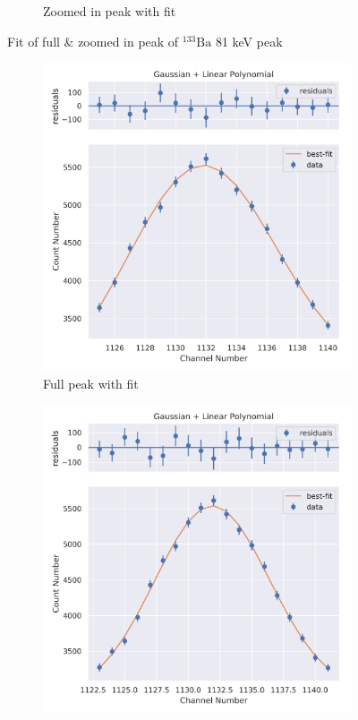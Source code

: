 \documentclass[11pt,a4paper]{article}
\newcommand{\element}[2]{$^{#2}\textrm{#1}$}
\begin{document}
\begin{figure}[H]
\begin{subfigure}{.5\linewidth}
    \caption{Zoomed in peak with fit}
  \end{subfigure}
  \caption{Fit of full \& zoomed in peak of \element{Ba}{133} 81 keV peak}
\end{figure}
\begin{figure}[H]
  \centering
  \begin{subfigure}{.5\linewidth}
    \centering
    \includegraphics[width=\linewidth]{./Images/Barium133/Linear/Linear_2_Full.png}
    \caption{Full peak with fit}
  \end{subfigure}%
  \begin{subfigure}{.5\linewidth}
    \centering
    \includegraphics[width=\linewidth]{./Images/Barium133/Linear/Linear_2_Zoom.png}

\end{subfigure}
\end{figure}
\end{document}
